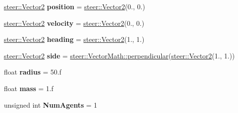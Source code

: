 \begin{DoxyCompactItemize}
\item 
\hypertarget{structsteer_1_1_behavior_parameters_aadb118c141d8c0175bedc20777803c30}{\hyperlink{structsteer_1_1_vector2}{steer\-::\-Vector2} {\bfseries position} = \hyperlink{structsteer_1_1_vector2}{steer\-::\-Vector2}(0., 0.)}\label{structsteer_1_1_behavior_parameters_aadb118c141d8c0175bedc20777803c30}

\item 
\hypertarget{structsteer_1_1_behavior_parameters_a1eb451a42b331aa2341b1dea9f328e04}{\hyperlink{structsteer_1_1_vector2}{steer\-::\-Vector2} {\bfseries velocity} = \hyperlink{structsteer_1_1_vector2}{steer\-::\-Vector2}(0., 0.)}\label{structsteer_1_1_behavior_parameters_a1eb451a42b331aa2341b1dea9f328e04}

\item 
\hypertarget{structsteer_1_1_behavior_parameters_a2c7064895bba7fc1ccc51efaa44f6662}{\hyperlink{structsteer_1_1_vector2}{steer\-::\-Vector2} {\bfseries heading} = \hyperlink{structsteer_1_1_vector2}{steer\-::\-Vector2}(1., 1.)}\label{structsteer_1_1_behavior_parameters_a2c7064895bba7fc1ccc51efaa44f6662}

\item 
\hypertarget{structsteer_1_1_behavior_parameters_a81873c897393052dd0b803d8fc240788}{\hyperlink{structsteer_1_1_vector2}{steer\-::\-Vector2} {\bfseries side} = \hyperlink{classsteer_1_1_vector_math_aa2820b8424b7d01bcbaf877d05108fd2}{steer\-::\-Vector\-Math\-::perpendicular}(\hyperlink{structsteer_1_1_vector2}{steer\-::\-Vector2}(1., 1.))}\label{structsteer_1_1_behavior_parameters_a81873c897393052dd0b803d8fc240788}

\item 
\hypertarget{structsteer_1_1_behavior_parameters_acb0b4440984dc6a8d94881bd4e347915}{float {\bfseries radius} = 50.f}\label{structsteer_1_1_behavior_parameters_acb0b4440984dc6a8d94881bd4e347915}

\item 
\hypertarget{structsteer_1_1_behavior_parameters_a5501930734d0c68b7aea3f6d8161d29d}{float {\bfseries mass} = 1.f}\label{structsteer_1_1_behavior_parameters_a5501930734d0c68b7aea3f6d8161d29d}

\item 
\hypertarget{structsteer_1_1_behavior_parameters_aa35f968812b162cd6cf429741c85b5d3}{unsigned int {\bfseries Num\-Agents} = 1}\label{structsteer_1_1_behavior_parameters_aa35f968812b162cd6cf429741c85b5d3}


\end{DoxyCompactItemize}
